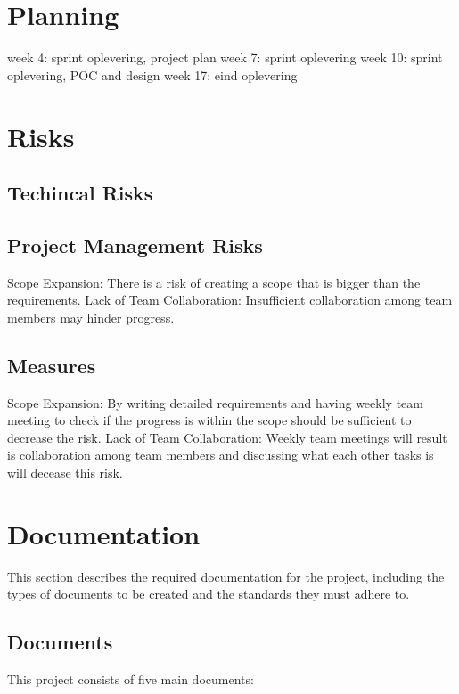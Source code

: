 \documentclass{projdoc}
\begin{document}
\newpage

\section{Planning}
week 4: sprint oplevering, project plan
week 7: sprint oplevering
week 10: sprint oplevering, POC and design
week 17: eind oplevering

\newpage

\section{Risks}
\subsection{Techincal Risks}
\subsection{Project Management Risks}
Scope Expansion: There is a risk of creating a scope that is bigger than the requirements.
Lack of Team Collaboration: Insufficient collaboration among team members 
may hinder progress.
\subsection{Measures}
Scope Expansion: By writing detailed requirements and having weekly team meeting to check if the progress is within the scope should be sufficient to decrease the risk.
Lack of Team Collaboration: Weekly team meetings will result is collaboration among team members and discussing what each other tasks is will decease this risk.
\newpage

\section{Documentation}

This section describes the required documentation for the project, including the
 types of documents to be created and the standards they must adhere to.

\subsection{Documents}

This project consists of five main documents:\noparbreak
\end{document}
